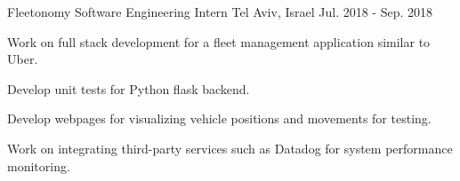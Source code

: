 \begin{cventries}
  \cventry
    {Fleetonomy} %
    {Software Engineering Intern} %
    {Tel Aviv, Israel} %
    {Jul. 2018 - Sep. 2018} %
    {
      \begin{cvitems} %
        \item {Work on full stack development for a fleet management application similar to Uber.}
        \item {Develop unit tests for Python flask backend.}
        \item {Develop webpages for visualizing vehicle positions and movements for testing.}
        \item {Work on integrating third-party services such as Datadog for system performance monitoring.}
      \end{cvitems}
    }
    
\end{cventries}
